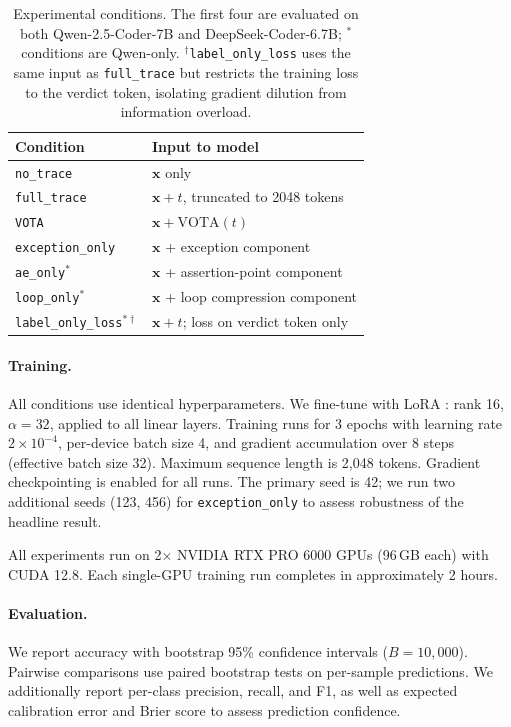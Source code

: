 \begin{table}[t]
\centering
\small
\begin{tabular}{lp{4.9cm}}
\toprule
\textbf{Condition} & \textbf{Input to model} \\
\midrule
\texttt{no\_trace} & $\mathbf{x}$ only \\
\texttt{full\_trace} & $\mathbf{x} + t$, truncated to 2048 tokens \\
\texttt{VOTA} & $\mathbf{x} + \text{VOTA}(t)$ \\
\texttt{exception\_only} & $\mathbf{x}$ + exception component \\
\texttt{ae\_only}$^*$ & $\mathbf{x}$ + assertion-point component \\
\texttt{loop\_only}$^*$ & $\mathbf{x}$ + loop compression component \\
\texttt{label\_only\_loss}$^{*\dag}$ & $\mathbf{x} + t$; loss on verdict token only \\
\bottomrule
\end{tabular}
\caption{Experimental conditions. The first four are evaluated on both Qwen-2.5-Coder-7B and DeepSeek-Coder-6.7B; $^*$conditions are Qwen-only. $^\dag$\texttt{label\_only\_loss} uses the same input as \texttt{full\_trace} but restricts the training loss to the verdict token, isolating gradient dilution from information overload.}
\label{tab:conditions}
\end{table}

\paragraph{Training.}
All conditions use identical hyperparameters.
We fine-tune with LoRA \citep{placeholder_HuLoRA2022}: rank 16, $\alpha{=}32$, applied to all linear layers.
Training runs for 3 epochs with learning rate $2{\times}10^{-4}$, per-device batch size 4, and gradient accumulation over 8 steps (effective batch size 32).
Maximum sequence length is 2{,}048 tokens.
Gradient checkpointing is enabled for all runs.
The primary seed is 42; we run two additional seeds (123, 456) for \texttt{exception\_only} to assess robustness of the headline result.

All experiments run on 2$\times$ NVIDIA RTX PRO 6000 GPUs (96\,GB each) with CUDA 12.8.
Each single-GPU training run completes in approximately 2 hours.

\paragraph{Evaluation.}
We report accuracy with bootstrap 95\% confidence intervals ($B{=}10{,}000$).
Pairwise comparisons use paired bootstrap tests on per-sample predictions.
We additionally report per-class precision, recall, and F1, as well as expected calibration error \citep[ECE;][]{placeholder_NaeiniICML2015} and Brier score to assess prediction confidence.
